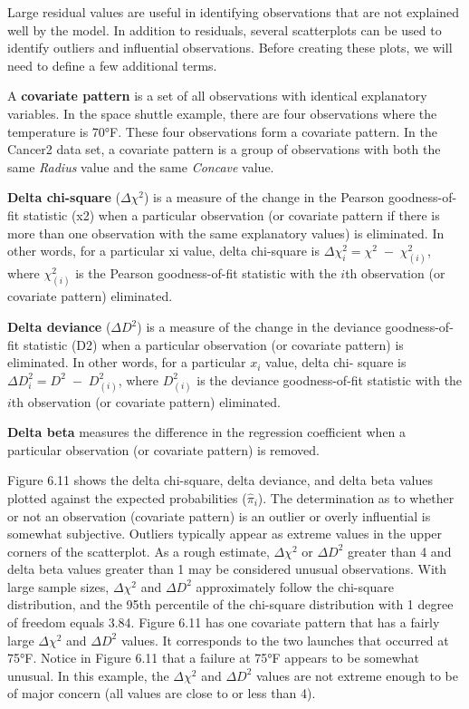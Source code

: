 \documentclass[
]{report}
\begin{document}
Large residual values are useful in identifying observations that are not explained well by the model. In addition to residuals, several scatterplots can be used to identify outliers and influential observations. Before creating these plots, we will need to define a few additional terms.

A \textbf{covariate pattern} is a set of all observations with identical explanatory variables. In the space shuttle example, there are four observations where the temperature is 70°F. These four observations form a covariate pattern. In the Cancer2 data set, a covariate pattern is a group of observations with both the same \emph{Radius} value and the same \emph{Concave} value.

\textbf{Delta chi-square} (\(\scriptstyle \Delta \chi^2\)) is a measure of the change in the Pearson goodness-of-fit statistic (x2) when a
particular observation (or covariate pattern if there is more than one observation with the same explanatory
values) is eliminated. In other words, for a particular xi value, delta chi-square is \(\scriptstyle \Delta \chi^2_i = \chi^2 \;-\;\chi^2_{(i)}\), where \(\scriptstyle \chi^2_{(i)}\) is the Pearson goodness-of-fit statistic with the \(\scriptstyle i\)th observation (or covariate pattern) eliminated.

\textbf{Delta deviance} (\(\scriptstyle \Delta D^2\)) is a measure of the change in the deviance goodness-of-fit statistic (D2) when a
particular observation (or covariate pattern) is eliminated. In other words, for a particular \(\scriptstyle x_i\) value, delta chi-
square is \(\scriptstyle \Delta D^2_i = D^2 \;-\; D^2_{(i)}\), where \(\scriptstyle D^2_{(i)}\) is the deviance goodness-of-fit statistic with the \(\scriptstyle i\)th observation (or covariate pattern) eliminated.

\textbf{Delta beta} measures the difference in the regression coefficient when a particular observation (or covariate pattern) is removed.

Figure 6.11 shows the delta chi-square, delta deviance, and delta beta values plotted against the expected probabilities (\(\scriptstyle \hat\pi_i\)). The determination as to whether or not an observation (covariate pattern) is an outlier or overly influential is somewhat subjective. Outliers typically appear as extreme values in the upper corners of the scatterplot. As a rough estimate, \(\scriptstyle \Delta\chi^2\) or \(\scriptstyle \Delta D^2\) greater than 4 and delta beta values greater than 1 may be considered unusual observations. With large sample sizes, \(\scriptstyle \Delta\chi^2\) and \(\scriptstyle \Delta D^2\) approximately follow the chi-square distribution, and the 95th percentile of the chi-square distribution with 1 degree of freedom equals 3.84. Figure 6.11 has one covariate pattern that has a fairly large \(\scriptstyle \Delta\chi^2\) and \(\scriptstyle \Delta D^2\) values. It corresponds to the two launches that occurred at 75°F. Notice in Figure 6.11 that a failure at 75°F appears to be somewhat unusual. In this example, the \(\scriptstyle \Delta\chi^2\) and \(\scriptstyle \Delta D^2\) values are not extreme enough to be of major concern (all values are close to or less than 4).
\end{document}
